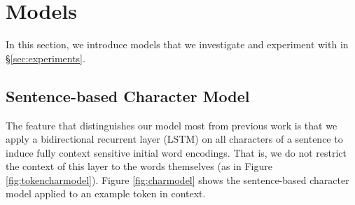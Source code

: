 \documentclass[11pt,a4paper]{article}
\begin{document}
\section{Models}
\label{sec:models}

In this section, we introduce models that we investigate and experiment with in \S\ref{sec:experiments}.


\subsection{Sentence-based Character Model}

The feature that distinguishes our model most from previous work is that we apply a bidirectional recurrent layer (LSTM) on all characters of a sentence to induce fully context sensitive initial word encodings. 
That is, we do not restrict the context of this layer to the words themselves (as in Figure \ref{fig:tokencharmodel}). 
Figure \ref{fig:charmodel} shows the sentence-based character
model applied to an example token in context.

\end{document}
